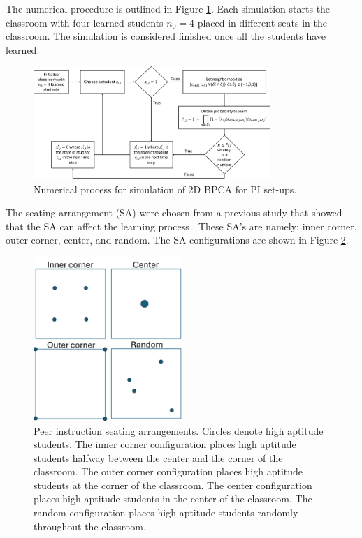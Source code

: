 The numerical procedure is outlined in Figure \ref{fig:2DBPCA PI Flowchart}. Each simulation starts the classroom with four learned students $n_0 = 4$ placed in different seats in the classroom. The simulation is considered finished once all the students have learned.

\begin{figure}[h!]
    \centering
    \includegraphics[width=0.8\textwidth]{figures/2DBPCA PI Flowchart.png}
    \caption[Peer instruction flowchart]{Numerical process for simulation of 2D BPCA for PI set-ups.}
    \label{fig:2DBPCA PI Flowchart}
\end{figure}

The seating arrangement (SA) were chosen from a previous study that showed that the SA can affect the learning process \cite{roxas2010seating}. These SA's are namely: inner corner, outer corner, center, and random. The SA configurations are shown in Figure \ref{fig:PI SAs}.

 \begin{figure}[h!]
    \centering
    \includegraphics[width=0.5\textwidth]{figures/PI SAs.png}
    \caption[Peer instruction seating arrangements.]{ Peer instruction seating arrangements. Circles denote high aptitude students. The inner corner configuration places high aptitude students halfway between the center and the corner of the classroom. The outer corner configuration places high aptitude students at the corner of the classroom. The center configuration places high aptitude students in the center of the classroom. The random configuration places high aptitude students randomly throughout the classroom.}
    \label{fig:PI SAs}
 \end{figure}

